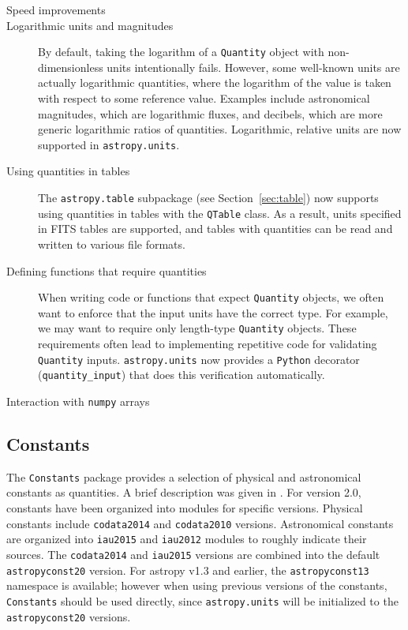 \documentclass[modern]{aastex61}
\newcommand{\package}[1]{\texttt{#1}\xspace}
\newcommand{\python}{\package{Python}}
\newcommand{\sectionname}{Section\xspace}
\newcommand{\inlinecomment}[2]{\todo[inline]{#1: #2}\xspace}
\begin{document}
\begin{description}
    \item[Speed improvements] \inlinecomment{TODO}{Marten}
    \item[Logarithmic units and magnitudes] By default, taking the logarithm of
        a \texttt{Quantity} object with non-dimensionless units intentionally
        fails.
        However, some well-known units are actually logarithmic quantities,
        where the logarithm of the value is taken with respect to some reference
        value.
        Examples include astronomical magnitudes, which are logarithmic fluxes,
        and decibels, which are more generic logarithmic ratios of quantities.
        Logarithmic, relative units are now supported in \texttt{astropy.units}.
    \item[Using quantities in tables] The \texttt{astropy.table} subpackage (see
        \sectionname~\ref{sec:table}) now supports using quantities in tables
        with the \texttt{QTable} class.
        As a result, units specified in FITS tables are supported, and tables
        with quantities can be read and written to various file formats.
    \item[Defining functions that require quantities] When writing code or
        functions that expect \texttt{Quantity} objects, we often want to
        enforce that the input units have the correct type.
        For example, we may want to require only length-type \texttt{Quantity}
        objects.
        These requirements often lead to implementing repetitive code for
        validating \texttt{Quantity} inputs.
        \texttt{astropy.units} now provides a \python decorator
        (\texttt{quantity\_input}) that does this verification automatically.
    \item[Interaction with \package{numpy} arrays] \inlinecomment{TODO}{Marten}
\end{description}

\subsection{Constants}


The \package{Constants} package provides a selection of physical and astronomical
constants as quantities.  A brief description was given in \cite{astropy}.
For version 2.0, constants have been organized into modules for specific versions.
Physical constants include \texttt{codata2014} \citep{codata2014}
and \texttt{codata2010} versions. Astronomical constants are organized
into \texttt{iau2015} and
\texttt{iau2012} modules to roughly indicate their sources.
The \texttt{codata2014} and \texttt{iau2015} versions are combined
into the default \texttt{astropyconst20}
version. For astropy v1.3 and earlier, the \texttt{astropyconst13}
namespace is available;
however when using previous versions of the constants,
\package{Constants} should be used
directly, since  \package{astropy.units} will be initialized to the
\texttt{astropyconst20} versions.
\end{document}
